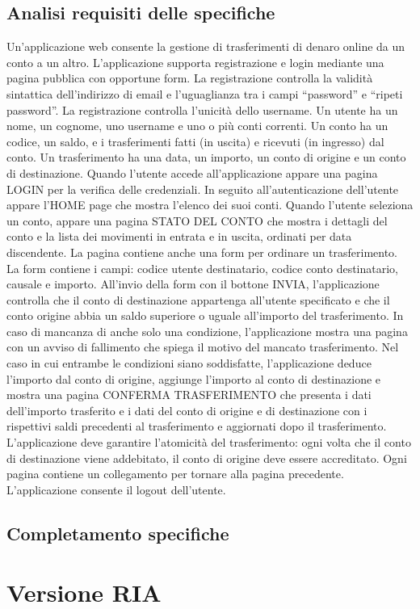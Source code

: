 \documentclass{article}
\begin{document}
\subsection{Analisi requisiti delle specifiche}
Un’applicazione web consente la gestione di trasferimenti di denaro online da un conto a un
altro. L’applicazione supporta registrazione e login mediante una pagina pubblica con
opportune form. La registrazione controlla la validità sintattica dell’indirizzo di email e
l’uguaglianza tra i campi “password” e “ripeti password”. La registrazione controlla l’unicità
dello username. Un utente ha un nome, un cognome, uno username e uno o più conti correnti.
Un conto ha un codice, un saldo, e i trasferimenti fatti (in uscita) e ricevuti (in ingresso) dal
conto. Un trasferimento ha una data, un importo, un conto di origine e un conto di destinazione.
Quando l’utente accede all’applicazione appare una pagina LOGIN per la verifica delle
credenziali. In seguito all’autenticazione dell’utente appare l’HOME page che mostra l’elenco
dei suoi conti. Quando l’utente seleziona un conto, appare una pagina STATO DEL CONTO
che mostra i dettagli del conto e la lista dei movimenti in entrata e in uscita, ordinati per data
discendente. La pagina contiene anche una form per ordinare un trasferimento. La form
contiene i campi: codice utente destinatario, codice conto destinatario, causale e importo.
All’invio della form con il bottone INVIA, l’applicazione controlla che il conto di destinazione
appartenga all’utente specificato e che il conto origine abbia un saldo superiore o uguale
all’importo del trasferimento. In caso di mancanza di anche solo una condizione, l’applicazione
mostra una pagina con un avviso di fallimento che spiega il motivo del mancato trasferimento.
Nel caso in cui entrambe le condizioni siano soddisfatte, l’applicazione deduce l’importo dal
conto di origine, aggiunge l’importo al conto di destinazione e mostra una pagina CONFERMA
TRASFERIMENTO che presenta i dati dell’importo trasferito e i dati del conto di origine e di
destinazione con i rispettivi saldi precedenti al trasferimento e aggiornati dopo il trasferimento.
L’applicazione deve garantire l’atomicità del trasferimento: ogni volta che il conto di
destinazione viene addebitato, il conto di origine deve essere accreditato. Ogni pagina
contiene un collegamento per tornare alla pagina precedente. L’applicazione consente il
logout dell’utente.

\subsection{Completamento specifiche}

\section{Versione RIA}
\end{document}
